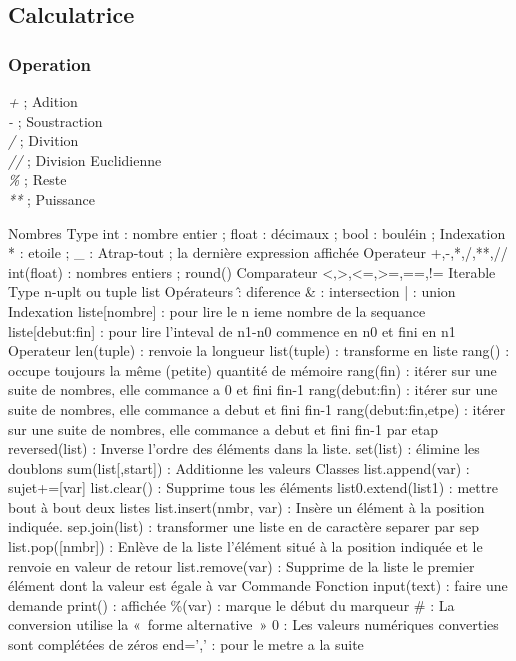 \documentclass[a4paper,12pt]{report}
\begin{document}
	\subsection{Calculatrice}
		\subsubsection{Operation}
			\textit{+} ; Adition\\
			\textit{-} ; Soustraction\\
			\textit{/} ; Divition\\
			\textit{//} ; Division Euclidienne\\
			\textit{\%} ; Reste\\
			\textit{**} ; Puissance

Nombres
	Type
		int : nombre entier ;
		float : décimaux ;
		bool : bouléin ;
	Indexation
		* : etoile ;
		\_ : Atrap-tout ; la dernière expression affichée
	Operateur
		+,-,*,/,**,//
		int(float) : nombres entiers ;
		round()
	Comparateur
		<,>,<=,>=,==,!=
Iterable
	Type
		n-uplt ou tuple
		list
	Opérateurs
		\^ : diference
		\& : intersection
		| : union
	Indexation
		liste[nombre] : pour lire le n ieme nombre de la sequance
		liste[debut:fin] : pour lire l'inteval de n1-n0 commence en n0 et fini en n1
	Operateur
		len(tuple) : renvoie la longueur
		list(tuple) : transforme en liste
		rang() : occupe toujours la même (petite) quantité de mémoire
			rang(fin) : itérer sur une suite de nombres, elle commance a 0 et fini fin-1
			rang(debut:fin) : itérer sur une suite de nombres, elle commance a debut et fini fin-1
			rang(debut:fin,etpe) : itérer sur une suite de nombres, elle commance a debut et fini fin-1 par etap
		reversed(list) : Inverse l'ordre des éléments dans la liste.
		set(list) : élimine les doublons
		sum(list[,start]) : Additionne les valeurs
	Classes
		list.append(var) : sujet+=[var]
		list.clear() : Supprime tous les éléments
		list0.extend(list1) : mettre bout à bout deux listes
		list.insert(nmbr, var) : Insère un élément à la position indiquée.
		sep.join(list) : transformer une liste en de caractère separer par sep
		list.pop([nmbr]) : Enlève de la liste l'élément situé à la position indiquée et le renvoie en valeur de retour
		list.remove(var) : Supprime de la liste le premier élément dont la valeur est égale à var
Commande
	Fonction
		input(text) : faire une demande
		print() : affichée
			\%(var) : marque le début du marqueur
				\# : La conversion utilise la « forme alternative »
				0 : Les valeurs numériques converties sont complétées de zéros
			end=',' : pour le metre a la suite
\end{document}
